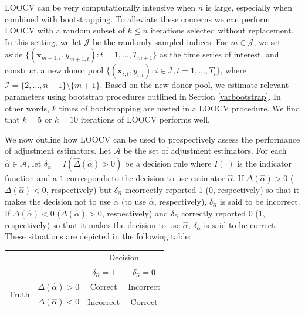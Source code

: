 \documentclass[11pt]{article}
\def\mbf#1{\mathbf{#1}} %
\def\mc#1{\mathcal{#1}} %
\theoremstyle{definition}
\begin{document}
LOOCV can be very computationally intensive when $n$ is large, especially when combined with bootstrapping. To alleviate these concerns we can perform LOOCV with a random subset of $k \leq n$ iterations selected without replacement. In this setting, we let $\mc{J}$ be the randomly sampled indices. For $m \in \mc{J}$, we set aside $\{(\mbf{x}_{m + 1, t}, y_{m + 1, t}) \colon t = 1, \ldots, T_{m+1}\}$ as the time series of interest, and construct a new donor pool $\{(\mbf{x}_{i, t}, y_{i, t}) \colon i \in \mc{I}, t = 1, \ldots, T_{i}\}$, where $\mc{I}=\{2, \ldots, n+1\} \setminus \{m+1\}$. Based on the new donor pool, we estimate relevant parameters using bootstrap procedures outlined in Section \ref{varbootstrap}. In other words, $k$ times of bootstrapping are nested in a LOOCV procedure.  We find that $k=5$ or $k=10$ iterations of LOOCV performs well.

We now outline how LOOCV can be used to prospectively assess the performance of adjustment estimators. Let $\mc{A}$ be the set of adjustment estimators. For each $\hat{\alpha} \in \mc{A}$, let $\delta_{\hat{\alpha}} = I(\hat\Delta(\hat{\alpha})>0)$ be a decision rule where $I(\cdot)$ is the indicator function and a $1$ corresponds to the decision to use  estimator $\hat\alpha$. If $\Delta(\hat{\alpha})>0$ ($\Delta(\hat{\alpha})<0$, respectively) but $\delta_{\hat{\alpha}}$ incorrectly reported 1 (0, respectively) so that it makes the decision not to use $\hat{\alpha}$ (to use $\hat{\alpha}$, respectively), $\delta_{\hat{\alpha}}$ is said to be incorrect. If $\Delta(\hat{\alpha})<0$ ($\Delta(\hat{\alpha})>0$, respectively) and  $\delta_{\hat{\alpha}}$ correctly reported 0 (1, respectively) so that it makes the decision to use $\hat{\alpha}$, $\delta_{\hat{\alpha}}$ is said to be correct. These situations are depicted in the following table: \vspace*{0.3cm}

\begin{center}
  \begin{center}
      \begin{tabular}{cc|c|c}
        \hline
        & & \multicolumn{2}{c}{Decision} \\
        & & $\delta_{\hat{\alpha}} = 1$ & $\delta_{\hat{\alpha}} = 0$ \\ 
                \hline
     \multirow{2}{*}{Truth}  & $\Delta(\hat{\alpha})>0$ & Correct & Incorrect \\
      \cline{3-4}
      & $\Delta(\hat{\alpha})<0$  & Incorrect & Correct \\
      \hline
      \end{tabular}
  \end{center}
\end{center}
\vspace*{0.3cm}
\end{document}
